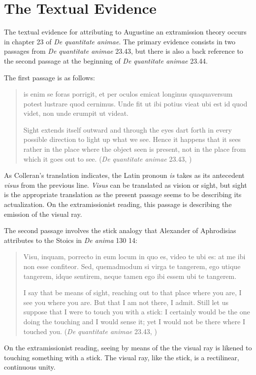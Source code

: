 \documentclass[12pt]{article}
\begin{document}

\section{The Textual Evidence} %
\label{sec:the_textual_evidence}

The textual evidence for attributing to Augustine an extramission theory occurs in chapter 23 of \emph{De quantitate animae}. The primary evidence consists in two passages from \emph{De quantitate animae} 23.43, but there is also a back reference to the second passage at the beginning of \emph{De quantitate animae} 23.44.

The first passage is as follows:
\begin{quote}
	is enim se foras porrigit, et per oculos emicat longinus quaquaversum potest lustrare quod cernimus. Unde fit ut ibi potius vieat ubi est id quod videt, non unde erumpit ut videat.
	
	Sight extends itself outward and through the eyes dart forth in every possible direction to light up what we see. Hence it happens that it sees rather in the place  where the object seen is present, not in the place from which it goes out to see. (\emph{De quantitate animae} 23.43, \citealt[66]{Colleran:1949ys}) 
\end{quote}
As Colleran's translation indicates, the Latin pronoun \emph{is} takes as its antecedent \emph{visus} from the previous line. \emph{Visus} can be translated as vision or sight, but sight is the appropriate translation as the present passage seems to be describing its actualization. On the extramissionist reading, this passage is describing the emission of the visual ray.

The second passage involves the stick analogy that Alexander of Aphrodisias attributes to the Stoics in \emph{De anima} 130 14:
\begin{quote}
	Visu, inquam, porrecto in eum locum in quo es, video te ubi es: at me ibi non esse confiteor. Sed, quemadmodum si virga te tangerem, ego utique tangerem, idque sentirem, neque tamen ego ibi essem ubi te tangerem. 
	
	I say that be means of sight, reaching out to that place where you are, I see you where you are. But that I am not there, I admit. Still let us suppose that I were to touch you with a stick: I certainly would be the one doing the touching and I would sense it; yet I would not be there where I touched you. (\emph{De quantitate animae} 23.43, \citealt[66]{Colleran:1949ys}) 
\end{quote}
On the extramissionist reading, seeing by means of the the visual ray is likened to touching something with a stick. The visual ray, like the stick, is a rectilinear, continuous unity.
\end{document}
